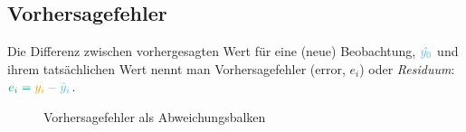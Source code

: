\documentclass[
  letterpaper,
]{scrbook}
\theoremstyle{definition}
\theoremstyle{definition}
\theoremstyle{definition}
\theoremstyle{remark}
\begin{document}
\subsection{Vorhersagefehler}\label{vorhersagefehler}

Die Differenz zwischen vorhergesagten Wert für eine (neue) Beobachtung,
\(\color{modelcol}{\hat{y_0}}\) und ihrem tatsächlichen Wert nennt man
Vorhersagefehler (error, \(e_i\)) oder \emph{Residuum}:
\(\color{errorcol}{e_i} = \color{ycol}{y_i} - \color{modelcol}{\hat{y}_i}\).

\begin{figure}

\begin{minipage}{0.50\linewidth}



\end{minipage}%
%
\begin{minipage}{0.50\linewidth}



\end{minipage}%

\caption{\label{fig-resid}Vorhersagefehler als Abweichungsbalken}

\end{figure}%
\end{document}

